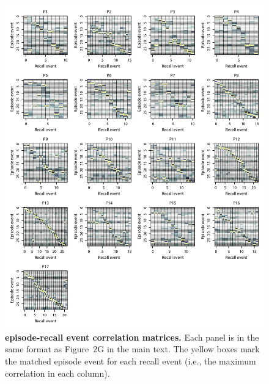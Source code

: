 \documentclass{article}
\begin{document}
\begin{figure}[p!]
\centering
\includegraphics[width=\textwidth]{figs/matchmats}
\caption{\small \textbf{episode-recall event correlation matrices.}  Each panel is in the same format as Figure~2G in the main text.  The yellow boxes mark the matched episode event for each recall event (i.e., the maximum correlation in each column).}
\label{fig:matchmats}
\end{figure}
\end{document}
